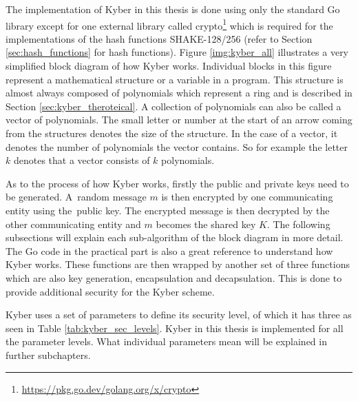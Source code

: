 The implementation of Kyber in this thesis is done using only the standard Go library except for one external library called crypto\footnote{\url{https://pkg.go.dev/golang.org/x/crypto}} which is required for the implementations of the hash functions SHAKE-128/256 (refer to Section \ref{sec:hash_functions} for hash functions). Figure \ref{img:kyber_all} illustrates a very simplified block diagram of how Kyber works. Individual blocks in this figure represent a mathematical structure or a variable in a program. This structure is almost always composed of polynomials which represent a ring and is described in Section \ref{sec:kyber_theroteical}. A collection of polynomials can also be called a vector of polynomials. The small letter or number at the start of an arrow coming from the structures denotes the size of the structure. In the case of a vector, it denotes the number of polynomials the vector contains. So for example the letter $k$ denotes that a vector consists of $k$ polynomials.

As to the process of how Kyber works, firstly the public and private keys need to be generated. A~random message $m$ is then encrypted by one communicating entity using the~public key. The encrypted message is then decrypted by the other communicating entity and $m$ becomes the shared key $K$. The following subsections will explain each sub-algorithm of the block diagram in more detail. The Go code in the practical part is also a great reference to understand how Kyber works. These functions are then wrapped by another set of three functions which are also key generation, encapsulation and decapsulation. This is done to provide additional security for the Kyber scheme.


Kyber uses a set of parameters to define its security level, of which it has three as seen in Table \ref{tab:kyber_sec_levels}. Kyber in this thesis is implemented for all the parameter levels. What individual parameters mean will be explained in further subchapters.
